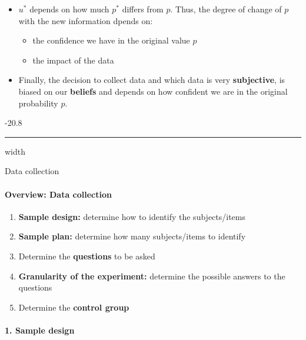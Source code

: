 \documentclass[a4paper, landscape, 6pt, fleqn]{scrartcl}
\makeatletter
\renewcommand{\emph}[1]{\textbf{#1}}
\renewcommand{\subsubsection}{\@startsection{subsubsection}{1}{0mm}%
{-2\baselineskip}{0.8\baselineskip}%
{\hrule depth 0.2pt width\columnwidth\vspace*{1.2em}\normalsize\bfseries}}
\makeatother
\begin{document}
\begin{multicols*}{4}
\begin{itemize}
\item $u^\ast$ depends on how much $p^\ast$ differs from $p$. Thus, the degree of change of $p$ with the new information dpends on:
\begin{itemize}
\item the confidence we have in the original value $p$
\item the impact of the data
\end{itemize}
\item Finally, the decision to collect data and which data is very \emph{subjective}, is biased on our \emph{beliefs} and depends on how confident we are in the original probability $p$.
\end{itemize}

\subsubsection{Data collection}

\paragraph{Overview: Data collection}

\begin{enumerate}
\item \emph{Sample design:} determine how to identify the subjects/items
\item \emph{Sample plan:} determine how many subjects/items to identify
\item Determine the \emph{questions} to be asked
\item \emph{Granularity of the experiment:} determine the possible answers to the questions
\item Determine the \emph{control group}
\end{enumerate}

\paragraph{1. Sample design}


\end{multicols*}
\end{document}

